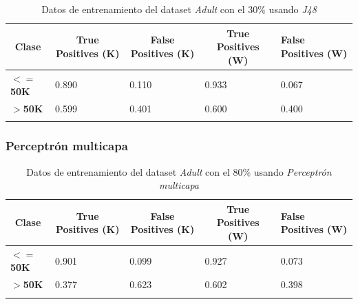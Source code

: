 \documentclass[10pt,a4paper]{article}
\begin{document}
\begin{table}[h]
\begin{tabular}{lllll}
\hline
\multicolumn{1}{|c|}{\textbf{Clase}} & \multicolumn{1}{c|}{\textbf{True Positives (K)}} & \multicolumn{1}{c|}{\textbf{False Positives (K)}} & \multicolumn{1}{c|}{\textbf{True Positives (W)}} & \multicolumn{1}{l|}{\textbf{False Positives (W)}} \\ \hline
\multicolumn{1}{|l|}{\textbf{$<=$50K}} & \multicolumn{1}{l|}{0.890}          & \multicolumn{1}{l|}{0.110}          & \multicolumn{1}{l|}{0.933}          & \multicolumn{1}{l|}{0.067} \\ \hline
\multicolumn{1}{|l|}{\textbf{$>$50K}} & \multicolumn{1}{l|}{0.599}          & \multicolumn{1}{l|}{0.401}          & \multicolumn{1}{l|}{0.600}          & \multicolumn{1}{l|}{0.400} \\ \hline
\textbf{}                       &                                &                                &                                &                      
\end{tabular}
\caption{Datos de entrenamiento del dataset \emph{Adult} con el 30\% usando \emph{J48}}
\label{tab:adult_j48_30}
\end{table}

\newpage
\subsubsection{Perceptrón multicapa}
\begin{table}[h]
\begin{tabular}{lllll}
\hline
\multicolumn{1}{|c|}{\textbf{Clase}} & \multicolumn{1}{c|}{\textbf{True Positives (K)}} & \multicolumn{1}{c|}{\textbf{False Positives (K)}} & \multicolumn{1}{c|}{\textbf{True Positives (W)}} & \multicolumn{1}{l|}{\textbf{False Positives (W)}} \\ \hline
\multicolumn{1}{|l|}{\textbf{$<=$50K}} & \multicolumn{1}{l|}{0.901}          & \multicolumn{1}{l|}{0.099}          & \multicolumn{1}{l|}{0.927}          & \multicolumn{1}{l|}{0.073} \\ \hline
\multicolumn{1}{|l|}{\textbf{$>$50K}} & \multicolumn{1}{l|}{0.377}          & \multicolumn{1}{l|}{0.623}          & \multicolumn{1}{l|}{0.602}          & \multicolumn{1}{l|}{0.398} \\ \hline
\textbf{}                       &                                &                                &                                &                      
\end{tabular}
\caption{Datos de entrenamiento del dataset \emph{Adult} con el 80\% usando \emph{Perceptrón multicapa}}
\label{tab:adult_perceptron_80}
\end{table}
\end{document}
